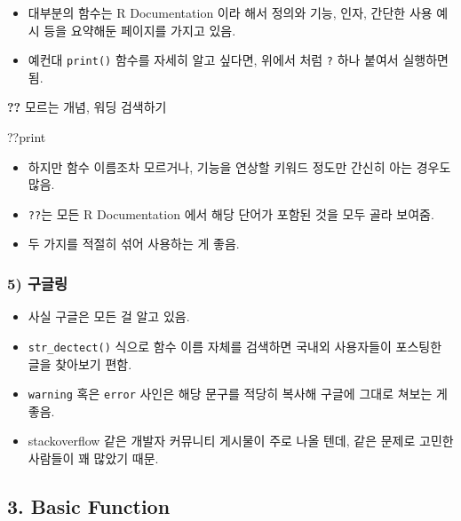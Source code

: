 \documentclass[
  12,
]{article}
\newenvironment{Shaded}{\begin{snugshade}}{\end{snugshade}}
\newcommand{\NormalTok}[1]{#1}
\begin{document}
\begin{itemize}
\item
  대부분의 함수는 R Documentation 이라 해서 정의와 기능, 인자, 간단한
  사용 예시 등을 요약해둔 페이지를 가지고 있음.
\item
  예컨대 \texttt{print()} 함수를 자세히 알고 싶다면, 위에서 처럼
  \texttt{?} 하나 붙여서 실행하면 됨.
\end{itemize}

\textbf{??} 모르는 개념, 워딩 검색하기

\begin{Shaded}
\begin{Highlighting}[]
\NormalTok{??print}
\end{Highlighting}
\end{Shaded}

\begin{itemize}
\item
  하지만 함수 이름조차 모르거나, 기능을 연상할 키워드 정도만 간신히 아는
  경우도 많음.
\item
  \texttt{??}는 모든 R Documentation 에서 해당 단어가 포함된 것을 모두
  골라 보여줌.
\item
  두 가지를 적절히 섞어 사용하는 게 좋음.
\end{itemize}

\hypertarget{uxad6cuxae00uxb9c1}{%
\subsubsection{5) 구글링}\label{uxad6cuxae00uxb9c1}}

\begin{itemize}
\item
  사실 구글은 모든 걸 알고 있음.
\item
  \texttt{str\_dectect()} 식으로 함수 이름 자체를 검색하면 국내외
  사용자들이 포스팅한 글을 찾아보기 편함.
\item
  \texttt{warning} 혹은 \texttt{error} 사인은 해당 문구를 적당히 복사해
  구글에 그대로 쳐보는 게 좋음.
\item
  stackoverflow 같은 개발자 커뮤니티 게시물이 주로 나올 텐데, 같은
  문제로 고민한 사람들이 꽤 많았기 때문.
\end{itemize}

\hypertarget{basic-function}{%
\subsection{3. Basic Function}\label{basic-function}}
\end{document}
